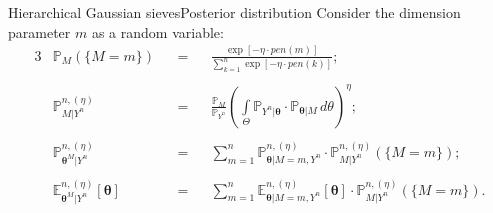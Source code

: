 \documentclass[10pt]{beamer}
\begin{document}
\begin{frame}{Hierarchical Gaussian sieves}{Posterior distribution}
Consider the dimension parameter $m$ as a random variable:
\begin{alignat*}{3}
&\mathbb{P}_{M}(\{M = m\}) &&=&& \frac{\exp[-\eta \cdot pen(m)]}{\sum\limits_{k=1}^{n}\exp[-\eta \cdot pen(k)]};\\
& && &&\\
&\mathbb{P}_{M \vert Y^{n}}^{n, (\eta)} &&=&& \frac{\mathbb{P}_{M}}{\mathbb{P}_{Y^{n}}} \left(\int\limits_{\Theta} \mathbb{P}_{Y^{n} \vert \boldsymbol{\theta}} \cdot \mathbb{P}_{\boldsymbol{\theta} \vert M} \,d\theta\right)^{\eta};\\
& && &&\\
&\mathbb{P}_{\boldsymbol{\theta}^{M} \vert Y^{n}}^{n, (\eta)} &&=&& \sum\limits_{m = 1}^{n} \mathbb{P}_{\boldsymbol{\theta} \vert M = m, Y^{n}}^{n, (\eta)} \cdot \mathbb{P}_{M \vert Y^{n}}^{n, (\eta)}(\{M = m\});\\
& && &&\\
&\mathbb{E}_{\boldsymbol{\theta}^{M} \vert Y^{n}}^{n, (\eta)}[\boldsymbol{\theta}] &&=&& \sum\limits_{m = 1}^{n} \mathbb{E}_{\boldsymbol{\theta} \vert M = m, Y^{n}}^{n, (\eta)}[\boldsymbol{\theta}] \cdot \mathbb{P}_{M \vert Y^{n}}^{n, (\eta)}(\{M = m\}).
\end{alignat*}
\end{frame}
\end{document}
